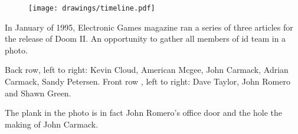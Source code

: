\par
\begin{figure}[H]
\centering
\texttt{[image: drawings/timeline.pdf]}
\end{figure}
\par





\begin{figure}
\end{figure}

In January of 1995, Electronic Games magazine ran a series of three articles for the release of Doom II. An opportunity to gather all members of id team in a photo.\\
\par Back row, left to right: Kevin Cloud, American Mcgee, John Carmack, Adrian Carmack, Sandy Petersen.
 Front row , left to right: Dave Taylor, John Romero and Shawn Green.\\
 \par
  The plank in the photo is in fact John Romero's office door and the hole the making of John Carmack.\\
 \par
{}






